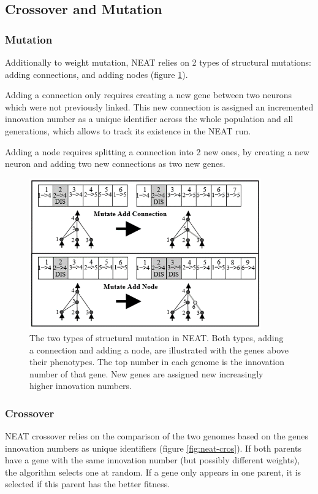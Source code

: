\subsection{Crossover and Mutation}

\subsubsection{Mutation}
Additionally to weight mutation, NEAT relies on 2 types of structural mutations: adding connections, and adding nodes (figure \ref{fig:neat-mut}).

Adding a connection only requires creating a new gene between two neurons which were not previously linked. This new connection is assigned an incremented innovation number as a unique identifier across the whole population and all generations, which allows to track its existence in the NEAT run. 

Adding a node requires splitting a connection into 2 new ones, by creating a new neuron and adding two new connections as two new genes. 

\begin{figure}[H]
\centering
\captionsetup{justification=centering,margin=2cm}
\includegraphics[width=10cm]{images/neat_mut.png}
\caption{The two types of structural mutation in NEAT. Both types, adding a connection and adding a node, are illustrated with the genes above their phenotypes.  The top number in each genome is  the innovation number of that gene. New genes are assigned new increasingly higher innovation numbers. \cite{NEAT_2}}
 \label{fig:neat-mut}
\end{figure}

\subsubsection{Crossover}
NEAT crossover relies on the comparison of the two genomes based on the genes innovation numbers as unique identifiers (figure \ref{fig:neat-cros}). If both parents have a gene with the same innovation number (but possibly different weights), the algorithm selects one at random. If a gene only appears in one parent, it is selected if this parent has the better fitness.

